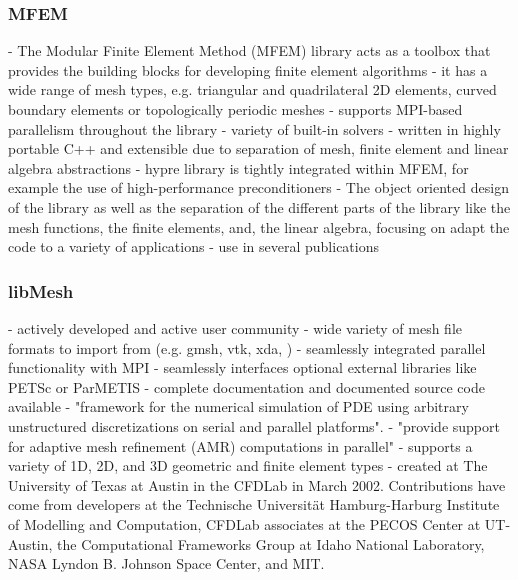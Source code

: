   \subsubsection{MFEM}\cite{mfem}
  - The Modular Finite Element Method (MFEM) library acts as a toolbox that provides the building blocks for developing finite element algorithms\newline
  - it has a wide range of mesh types, e.g. triangular and quadrilateral 2D elements, curved boundary elements or topologically periodic meshes\newline
  - supports MPI-based parallelism throughout the library\newline
  - variety of built-in solvers\newline
  - written in highly portable C++ and extensible due to separation of mesh, finite element and linear algebra abstractions\newline
  - hypre library is tightly integrated within MFEM, for example the use of high-performance preconditioners
  - The object oriented design of the library as well as the separation of the different parts of the library like the mesh functions, the finite elements, and, the linear algebra, focusing on adapt the code to a variety of applications
  - use in several publications \cite{mfemPubs}
  \subsubsection{libMesh}\cite{libmesh}
  - actively developed and active user community\newline
  - wide variety of mesh file formats to import from (e.g. gmsh, vtk, xda, )\newline
  - seamlessly integrated parallel functionality with MPI\newline
  - seamlessly interfaces optional external libraries like PETSc or ParMETIS\newline
  - complete documentation and documented source code available\newline
  - "framework for the numerical simulation of PDE using arbitrary unstructured discretizations on serial and parallel platforms".\newline
  - "provide support for adaptive mesh refinement (AMR) computations in parallel"\newline
  - supports a variety of 1D, 2D, and 3D geometric and finite element types\newline
  - created at The University of Texas at Austin in the CFDLab in March 2002. Contributions have come from developers at the Technische Universität Hamburg-Harburg Institute of Modelling and Computation, CFDLab associates at the PECOS Center at UT-Austin, the Computational Frameworks Group at Idaho National Laboratory, NASA Lyndon B. Johnson Space Center, and MIT.
\newpage